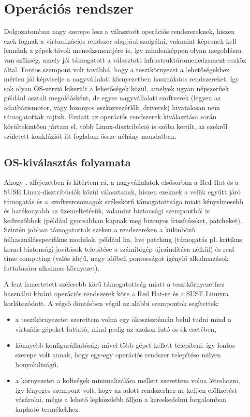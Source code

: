 \section{Operációs rendszer}
Dolgozatomban nagy szerepe lesz a választott operációs rendszereknek, hiszen ezek fognak a virtualizációs rendszer alapjául szolgálni, valamint képesnek kell lennünk a gépek távoli menedzsmentjére is, így mindenképpen olyan megoldásra van szükség, amely jól támogatott a választott infrastruktúramenedzsment-eszköz által. Fontos szempont volt továbbá, hogy a tesztkörnyezet a lehetőségekhez mérten jól képviselje a nagyvállalati környezetben használatos rendszereket, így sok olyan OS-verzió kikerült a lehetőségek közül, amelyek ugyan népszerűek például asztali megoldásként, de egyes nagyvállalati szoftverek (legyen az adatbázismotor, vagy bizonyos eszközvezérlők, driverek) hivatalosan nem támogatottak rajtuk. Emiatt az operációs rendszerek kiválasztása során körültekintően jártam el, több Linux-disztribúció is szóba került, az ezekről született konklúziót itt foglalom össze néhány mondatban.

\subsection{OS-kiválasztás folyamata}
Ahogy . alfejezetben is kitértem rá, a nagyvállalatok elsősorban a Red Hat és a SUSE Linux-disztribúciók közül választanak, hiszen ezeknek a velük együtt járó támogatás és a~szoftvercsomagok széleskörű támogatottsága miatt kényelmesebb és hatékonyabb az üzemeltetésük, valamint biztonsági szempontból is kedvezőbbek (például gyorsabban kapnak meg bizonyos frissítéseket, patcheket). Szintén jobban támogatottak ezeken a rendszereken a különböző felhasználásspecifikus modulok, például \acrfull{ha}, live patching (támogatás pl. kritikus kernel biztonsági javítások telepítése a számítógép újraindítása nélkül) és real time computing (valós idejű, nagy időbeli pontosságot igénylő alkalmazások futtatására alkalmas környezet).

A fent ismertetett szélesebb körű támogatottság miatt a tesztkörnyezethez használni kívánt operációs rendszerek köre a Red Hat-re és a SUSE Linuxra korlátozódott. A végső döntésben végül az alábbi szempontok segítettek:
\begin{itemize}
	\item a tesztkörnyezetet szerettem volna egy ökoszisztémán belül tudni mind a virtuális gépeket futtató, mind pedig az azokon futó \acrshort{os}-ek esetében,
	\item könnyebb konfigurálhatóság: mivel több gépet kellett telepíteni, így fontos szerepe volt annak, hogy egy-egy operációs rendszer telepítése milyen bonyolultságú,
	\item a környezetet a költségek minimalizálása mellett szerettem volna létrehozni, így lényeges szempont volt, hogy az adott rendszerhez ne kelljen előfizetést vásárolni, mégis a lehető legközelebb álljon a kereskedelmi forgalomban kapható termékekhez.
\end{itemize}

